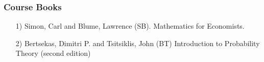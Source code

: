 \documentclass{beamer}
\numberwithin{equation}{section}
\begin{document}
\begin{frame}
\frametitle{Course Books}


\begin{itemize}
\item[1)] Simon, Carl and Blume, Lawrence (SB).  Mathematics for Economists.
\item[2)] Bertsekas, Dimitri P. and Tsitsiklis, John (BT) Introduction to Probability Theory (second edition)
\end{itemize}

\end{frame}
\end{document}
